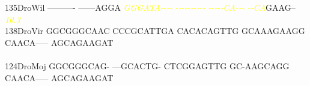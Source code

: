 \documentclass[11pt,twoside,reqno,a4paper]{article}
\begin{document}
{135\hspace*{1\charwidth}DroWil	----------	------AGGA	\textit{\textcolor{Yellow}{G}}\textit{\textcolor{Yellow}{G}}\textit{\textcolor{Yellow}{G}}\textit{\textcolor{Yellow}{A}}\textit{\textcolor{Yellow}{T}}\textit{\textcolor{Yellow}{A}}\textit{\textcolor{Yellow}{-}}\textit{\textcolor{Yellow}{-}}\textit{\textcolor{Yellow}{-}}\textit{\textcolor{Yellow}{-}}	\textit{\textcolor{Yellow}{-}}\textit{\textcolor{Yellow}{-}}\textit{\textcolor{Yellow}{-}}\textit{\textcolor{Yellow}{-}}\textit{\textcolor{Yellow}{-}}\textit{\textcolor{Yellow}{-}}\textit{\textcolor{Yellow}{-}}\textit{\textcolor{Yellow}{-}}\textit{\textcolor{Yellow}{-}}\textit{\textcolor{Yellow}{-}}	\textit{\textcolor{Yellow}{-}}\textit{\textcolor{Yellow}{-}}\textit{\textcolor{Yellow}{-}}\textit{\textcolor{Yellow}{-}}\textit{\textcolor{Yellow}{-}}\textit{\textcolor{Yellow}{C}}\textit{\textcolor{Yellow}{A}}\textit{\textcolor{Yellow}{-}}\textit{\textcolor{Yellow}{-}}\textit{\textcolor{Yellow}{-}}	\textit{\textcolor{Yellow}{-}}\textit{\textcolor{Yellow}{-}}\textit{\textcolor{Yellow}{C}}\textit{\textcolor{Yellow}{A}}GAAG--	\\
\hspace*{4\charwidth}\hspace*{7\charwidth}\hspace*{1\charwidth}\hspace*{1\charwidth}\hspace*{20\charwidth}\textit{\textcolor{Yellow}{10.3}}\hspace*{1\charwidth}\hspace*{1\charwidth}\hspace*{1\charwidth}\hspace*{1\charwidth}\\
138\hspace*{1\charwidth}DroVir	GGCGGGCAAC	CCCGCATTGA	CACACAGTTG	GCAAAGAAGG	CAACA-----	AGCAGAAGAT	\\
\hspace*{4\charwidth}\hspace*{7\charwidth}\hspace*{1\charwidth}\hspace*{1\charwidth}\hspace*{1\charwidth}\hspace*{1\charwidth}\hspace*{1\charwidth}\hspace*{1\charwidth}\\
124\hspace*{1\charwidth}DroMoj	GGCGGGCAG-	---GCACTG-	CTCGGAGTTG	GC-AAGCAGG	CAACA-----	AGCAGAAGAT	\\
}
\end{document}

